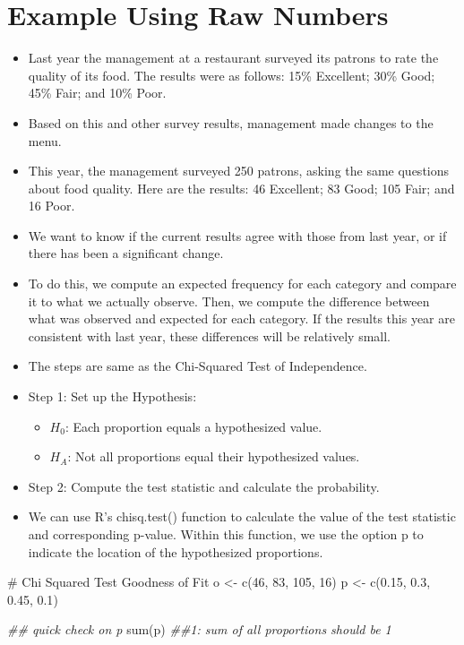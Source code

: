 \documentclass[
  letterpaper,
  DIV=11,
  numbers=noendperiod]{scrreprt}
\newenvironment{Shaded}{\begin{snugshade}}{\end{snugshade}}
\newcommand{\CommentTok}[1]{\textcolor[rgb]{0.37,0.37,0.37}{#1}}
\newcommand{\DecValTok}[1]{\textcolor[rgb]{0.68,0.00,0.00}{#1}}
\newcommand{\DocumentationTok}[1]{\textcolor[rgb]{0.37,0.37,0.37}{\textit{#1}}}
\newcommand{\FloatTok}[1]{\textcolor[rgb]{0.68,0.00,0.00}{#1}}
\newcommand{\FunctionTok}[1]{\textcolor[rgb]{0.28,0.35,0.67}{#1}}
\newcommand{\NormalTok}[1]{\textcolor[rgb]{0.00,0.23,0.31}{#1}}
\newcommand{\OtherTok}[1]{\textcolor[rgb]{0.00,0.23,0.31}{#1}}
\providecommand{\tightlist}{%
  \setlength{\itemsep}{0pt}\setlength{\parskip}{0pt}}\usepackage{longtable,booktabs,array}
\begin{document}
\section{Example Using Raw Numbers}\label{example-using-raw-numbers}

\begin{itemize}
\item
  Last year the management at a restaurant surveyed its patrons to rate
  the quality of its food. The results were as follows: 15\% Excellent;
  30\% Good; 45\% Fair; and 10\% Poor.
\item
  Based on this and other survey results, management made changes to the
  menu.
\item
  This year, the management surveyed 250 patrons, asking the same
  questions about food quality. Here are the results: 46 Excellent; 83
  Good; 105 Fair; and 16 Poor.
\item
  We want to know if the current results agree with those from last
  year, or if there has been a significant change.
\item
  To do this, we compute an expected frequency for each category and
  compare it to what we actually observe. Then, we compute the
  difference between what was observed and expected for each category.
  If the results this year are consistent with last year, these
  differences will be relatively small.
\item
  The steps are same as the Chi-Squared Test of Independence.
\item
  Step 1: Set up the Hypothesis:

  \begin{itemize}
  \tightlist
  \item
    \(𝐻_0\): Each proportion equals a hypothesized value.
  \item
    \(𝐻_A\): Not all proportions equal their hypothesized values.
  \end{itemize}
\item
  Step 2: Compute the test statistic and calculate the probability.
\item
  We can use R's chisq.test() function to calculate the value of the
  test statistic and corresponding p-value. Within this function, we use
  the option p to indicate the location of the hypothesized
  proportions.\\
\end{itemize}

\begin{Shaded}
\begin{Highlighting}[]
\CommentTok{\# Chi Squared Test Goodness of Fit}
\NormalTok{o }\OtherTok{\textless{}{-}} \FunctionTok{c}\NormalTok{(}\DecValTok{46}\NormalTok{, }\DecValTok{83}\NormalTok{, }\DecValTok{105}\NormalTok{, }\DecValTok{16}\NormalTok{)}
\NormalTok{p }\OtherTok{\textless{}{-}} \FunctionTok{c}\NormalTok{(}\FloatTok{0.15}\NormalTok{, }\FloatTok{0.3}\NormalTok{, }\FloatTok{0.45}\NormalTok{, }\FloatTok{0.1}\NormalTok{)}

\DocumentationTok{\#\# quick check on p}
\FunctionTok{sum}\NormalTok{(p)  }\DocumentationTok{\#\#1: sum of all proportions should be 1}
\end{Highlighting}
\end{Shaded}
\end{document}
